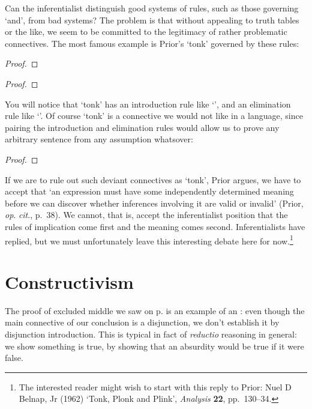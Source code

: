 Can the inferentialist distinguish good systems of rules, such as those governing `and', from bad systems? The problem is that without appealing to truth tables or the like, we seem to be committed to the legitimacy of rather problematic connectives. The most famous example is Prior's `tonk' governed by these rules:

\begin{multicols}{2}\noindent
	\begin{proof}
		\have[\ ]{}{\vdots}
		 
	\end{proof}

	\begin{proof}
		\have[\ ]{}{\vdots}
		 
	\end{proof}
\end{multicols}

You will notice that `tonk' has an introduction rule like `\eor', and an elimination rule like `\eand'. Of course `tonk' is a connective we would not like in a language, since pairing the introduction and elimination rules would allow us to prove any arbitrary sentence from any assumption whatsover: \begin{proof}
\end{proof}

If we are to rule out such deviant connectives as `tonk', Prior argues, we have to accept that  `an expression must have some independently determined meaning before we can discover whether inferences involving it are valid or invalid' (Prior, \emph{op}. \emph{cit}., p.\ 38). We cannot, that is, accept the inferentialist position that the rules of implication come first and the meaning comes second. Inferentialists have replied, but we must unfortunately leave this interesting debate here for now.\footnote{The interested reader might wish to start with this reply to Prior: Nuel D Belnap, Jr (1962) `Tonk, Plonk and Plink', \emph{Analysis} \textbf{22}, pp.\ 130–34.}

\section{Constructivism} \label{construct}

The proof of excluded middle we saw on p. \pageref{excmidd} is an example of an : even though the main connective of our conclusion is a disjunction, we don't establish it by disjunction introduction. This is typical in fact of \emph{reductio} reasoning in general: we show something is true, by showing that an absurdity would be true if it were false.

